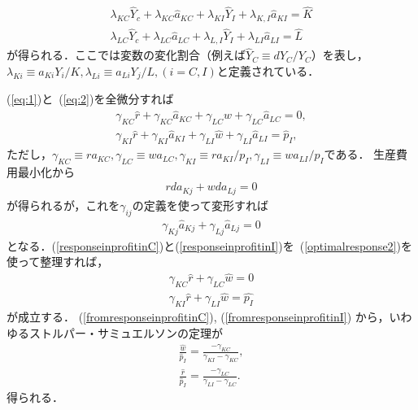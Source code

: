 \documentclass[12pt,a4paper]{jsarticle}
\begin{document}
\begin{align}
	\lambda_{KC} \hat{Y}_{c} + \lambda_{KC} \hat{a}_{KC} +\lambda_{KI} \hat{Y}_{I} + \lambda_{K,I} \hat{a}_{KI} = \hat{K} \label{repsonseincapital-equilibrium}\\
	\lambda_{LC} \hat{Y}_{c} + \lambda_{LC} \hat{a}_{LC} +\lambda_{L,I} \hat{Y}_{I} + \lambda_{LI} \hat{a}_{LI} = \hat{L} \label{repsonseinlabor-equilibrium}
\end{align}
が得られる．ここで$\hat{}$は変数の変化割合（例えば$\hat{Y}_{C} \equiv dY_{C}/Y_{C}$）を表し，$\lambda_{Ki} \equiv a_{Ki}Y_{i}/K, \lambda_{Li} \equiv a_{Li}Y_{j}/L, (i = C, I)$と定義されている．

(\ref{eq:1})と~(\ref{eq:2})を全微分すれば
\begin{align}
	\gamma_{KC} \hat{r} + \gamma_{KC} \hat{a}_{KC} + \gamma_{LC} \hat{w} + \gamma_{LC} \hat{a}_{LC} = 0, \label{responseinprofitinC}\\
	\gamma_{KI} \hat{r} + \gamma_{KI} \hat{a}_{KI} + \gamma_{LI} \hat{w} + \gamma_{LI} \hat{a}_{LI} = \hat{p}_{I}, \label{responseinprofitinI}
\end{align}
ただし，$\gamma_{KC} \equiv  r a_{KC}, \gamma_{LC} \equiv  w a_{LC}, \gamma_{KI} \equiv  r a_{KI} /p_{I}, \gamma_{LI} \equiv  w a_{LI}/p_{I}$である．
生産費用最小化から
\begin{align}
	r d a_{Kj} + w da_{Lj} =0 \label{optimalresponse}
\end{align}
が得られるが，これを$\gamma_{ij}$の定義を使って変形すれば
\begin{align}
	\gamma_{Kj} \hat{a}_{Kj} + \gamma_{Lj} \hat{a}_{Lj} =0 \label{optimalresponse2}
\end{align}
となる．(\ref{responseinprofitinC})と(\ref{responseinprofitinI})を~(\ref{optimalresponse2})を使って整理すれば，
\begin{align}
	\gamma_{KC} \hat{r} + \gamma_{LC} \hat{w} = 0 \label{fromresponseinprofitinC}\\
	\gamma_{KI} \hat{r} + \gamma_{LI} \hat{w} = \hat{p_{I}} \label{fromresponseinprofitinI}
\end{align}
が成立する．
(\ref{fromresponseinprofitinC}), (\ref{fromresponseinprofitinI})
から，いわゆるストルパー・サミュエルソンの定理が
\begin{align}
	\frac{\hat{w}}{\hat{p}_{I}} = \frac{- \gamma_{KC}}{\gamma_{KI} -\gamma_{KC}}, \label{ss1}\\
	\frac{\hat{r}}{\hat{p}_{I}} = \frac{- \gamma_{LC}}{\gamma_{LI} -\gamma_{LC}}.  \label{ss2}
\end{align}
得られる．
\end{document}
